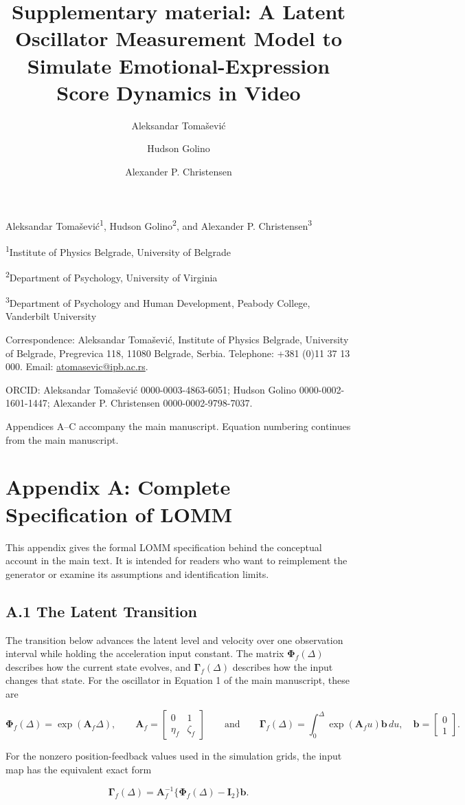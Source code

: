 \documentclass[
]{article}
\title{Supplementary material: A Latent Oscillator Measurement Model to
Simulate Emotional-Expression Score Dynamics in Video}
\author{Aleksandar Tomašević \and Hudson Golino \and Alexander P.
Christensen}
\date{}
\makeatletter
\renewcommand{\maketitle}{%
  \begin{center}
  {\Large\bfseries \@title\par}\vspace{1em}
  Aleksandar Tomašević\textsuperscript{1}, Hudson Golino\textsuperscript{2}, and
  Alexander P. Christensen\textsuperscript{3}\par\vspace{0.5em}
  {\small
  \textsuperscript{1}Institute of Physics Belgrade, University of Belgrade\par
  \textsuperscript{2}Department of Psychology, University of Virginia\par
  \textsuperscript{3}Department of Psychology and Human Development, Peabody College, Vanderbilt University\par}
  \end{center}
  \noindent Correspondence: Aleksandar Tomašević, Institute of Physics Belgrade,
  University of Belgrade, Pregrevica 118, 11080 Belgrade, Serbia.
  Telephone: +381 (0)11 37 13 000. Email: \href{mailto:atomasevic@ipb.ac.rs}{atomasevic@ipb.ac.rs}.\par
  \noindent ORCID: Aleksandar Tomašević 0000-0003-4863-6051;
  Hudson Golino 0000-0002-1601-1447;
  Alexander P. Christensen 0000-0002-9798-7037.\par
  \vspace{1em}
}
\let\submissiontitle\maketitle
\renewcommand{\maketitle}{\submissiontitle\clearpage}
\makeatother
\begin{document}
\maketitle


Appendices A--C accompany the main manuscript. Equation numbering
continues from the main manuscript.

\setcounter{equation}{2}
\setcounter{table}{0}
\renewcommand{\thetable}{A\arabic{table}}
\setcounter{figure}{0}
\renewcommand{\thefigure}{A\arabic{figure}}

\section{Appendix A: Complete Specification of
LOMM}\label{appendix-a-complete-specification-of-lomm}

This appendix gives the formal LOMM specification behind the conceptual
account in the main text. It is intended for readers who want to
reimplement the generator or examine its assumptions and identification
limits.

\subsection{A.1 The Latent Transition}\label{a.1-the-latent-transition}

The transition below advances the latent level and velocity over one
observation interval while holding the acceleration input constant. The
matrix \(\boldsymbol\Phi_f(\Delta)\) describes how the current state
evolves, and \(\boldsymbol\Gamma_f(\Delta)\) describes how the input
changes that state. For the oscillator in Equation 1 of the main
manuscript, these are

\[
\boldsymbol{\Phi}_f(\Delta)=\exp(\mathbf{A}_f\Delta),
\qquad
\mathbf{A}_f=
\begin{bmatrix}
0 & 1 \\
\eta_f & \zeta_f
\end{bmatrix}
\qquad
\text{and}
\qquad
\boldsymbol{\Gamma}_f(\Delta)=\int_0^{\Delta}\exp(\mathbf{A}_f u)\mathbf{b}\,du,
\quad
\mathbf{b}=
\begin{bmatrix}
0 \\
1
\end{bmatrix}.
\]

For the nonzero position-feedback values used in the simulation grids,
the input map has the equivalent exact form

\[
\boldsymbol{\Gamma}_f(\Delta)
=\mathbf{A}_f^{-1}\{\boldsymbol{\Phi}_f(\Delta)-\mathbf{I}_2\}\mathbf{b}.
\]
\end{document}
